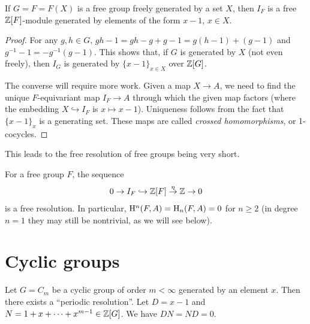\begin{thm}
    If $G=F=F(X)$ is a free group freely generated by a set $X$, then $I_F$ is a free $\mathbb{Z}[F]$-module generated by elements of the form $x-1$, $x\in X$.
\end{thm}
\begin{proof}
    For any $g,h\in G$, $gh-1=gh-g+g-1=g(h-1)+(g-1)$ and $g^{-1}-1=-g^{-1}(g-1)$. This shows that, if $G$ is generated by $X$ (not even freely), then $I_G$ is generated by $\{x-1\}_{x\in X}$ over $\mathbb{Z}[G]$.

    The converse will require more work. Given a map $X\to A$, we need to find the unique $F$-equivariant map $I_F\to A$ through which the given map factors (where the embedding $X\hookrightarrow I_F$ is $x\mapsto x-1$). Uniqueness follows from the fact that $\{x-1\}_x$ is a generating set. These maps are called \emph{crossed homomorphisms}, or 1-cocycles.
\end{proof}

This leads to the free resolution of free groups being very short.
\begin{cor}
    For a free group $F$, the sequence
    \[0\to I_F\hookrightarrow \mathbb{Z}[F]\overset{\eta}{\to} \mathbb{Z}\to 0\]
    is a free resolution. In particular, $\mathrm{H}^n(F,A)=\mathrm{H}_n(F,A)=0$ for $n\geq 2$ (in degree $n=1$ they may still be nontrivial, as we will see below).
\end{cor}





\section{Cyclic groups}


Let $G=C_m$ be a cyclic group of order $m<\infty$ generated by an element $x$. Then there exists a ``periodic resolution''. Let $D=x-1$ and $N=1+x+\cdots +x^{m-1}\in\mathbb{Z}[G]$. We have $DN=ND=0$.


